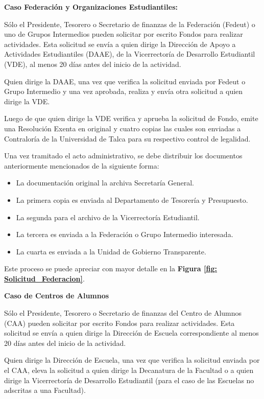 \begin{tasks}[counter-format = {tsk[A].}]
    \task \textbf{Caso Federación y Organizaciones Estudiantiles:}

    Sólo el Presidente, Tesorero o Secretario de finanzas de la Federación (Fedeut) o uno de Grupos Intermedios pueden solicitar por escrito Fondos para realizar actividades. Esta solicitud se envía a quien dirige la Dirección de Apoyo a Actividades Estudiantiles (DAAE), de la Vicerrectoría de Desarrollo Estudiantil (VDE), al menos 20 días antes del inicio de la actividad. 

    Quien dirige la DAAE, una vez que verifica la solicitud enviada por Fedeut o Grupo Intermedio y una vez aprobada, realiza y envía otra solicitud a quien dirige la VDE.

    Luego de que quien dirige la VDE verifica y aprueba la solicitud de Fondo, emite una Resolución Exenta en original y cuatro copias las cuales son enviadas a Contraloría de la Universidad de Talca para su respectivo control de legalidad. 
    
    Una vez tramitado el acto administrativo, se debe distribuir los documentos anteriormente mencionados de la siguiente forma: 

    \begin{itemize}
        \item La documentación original la archiva Secretaría General.
        \item La primera copia es enviada al Departamento de Tesorería y Presupuesto.
        \item La segunda para el archivo de la Vicerrectoría Estudiantil.
        \item La tercera es enviada a la Federación o Grupo Intermedio interesada.
        \item La cuarta es enviada a la Unidad de Gobierno Transparente.
    \end{itemize}

    Este proceso se puede apreciar con mayor detalle en la \textbf{Figura \ref{fig: Solicitud_Federacion}}.

    \task \textbf{Caso de Centros de Alumnos}

    Sólo el Presidente, Tesorero o Secretario de finanzas del Centro de Alumnos (CAA) pueden solicitar por escrito Fondos para realizar actividades. Esta solicitud se envía a quien dirige la Dirección de Escuela correspondiente al menos 20 días antes del inicio de la actividad. 

    Quien dirige la Dirección de Escuela, una vez que verifica la solicitud enviada por el CAA, eleva la solicitud a quien dirige la Decanatura de la Facultad o a quien dirige la Vicerrectoría de Desarrollo Estudiantil (para el caso de las Escuelas no adscritas a una Facultad).


\end{tasks}
